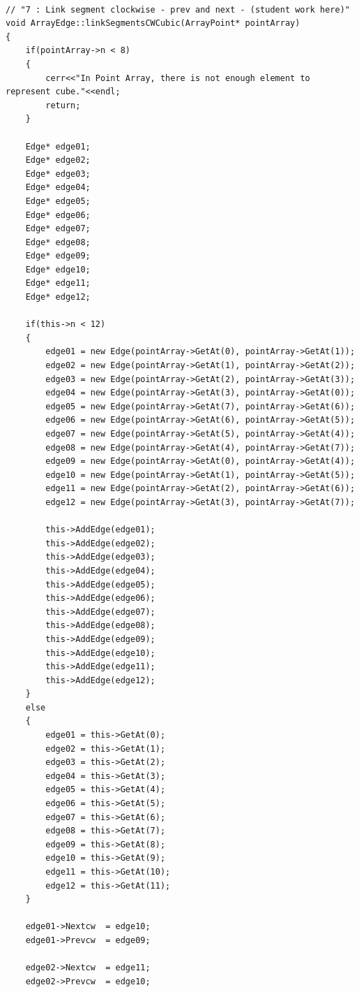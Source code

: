 \documentclass{article}
\begin{document}
\begin{lstlisting}[label=exercice-cpp, caption=Exercice.cpp]	

// "7 : Link segment clockwise - prev and next - (student work here)"
void ArrayEdge::linkSegmentsCWCubic(ArrayPoint* pointArray)
{
    if(pointArray->n < 8)
    {
        cerr<<"In Point Array, there is not enough element to represent cube."<<endl;
        return;
    }

    Edge* edge01;
    Edge* edge02;
    Edge* edge03;
    Edge* edge04;
    Edge* edge05;
    Edge* edge06;
    Edge* edge07;
    Edge* edge08;
    Edge* edge09;
    Edge* edge10;
    Edge* edge11;
    Edge* edge12;

    if(this->n < 12)
    {
        edge01 = new Edge(pointArray->GetAt(0), pointArray->GetAt(1));
        edge02 = new Edge(pointArray->GetAt(1), pointArray->GetAt(2));
        edge03 = new Edge(pointArray->GetAt(2), pointArray->GetAt(3));
        edge04 = new Edge(pointArray->GetAt(3), pointArray->GetAt(0));
        edge05 = new Edge(pointArray->GetAt(7), pointArray->GetAt(6));
        edge06 = new Edge(pointArray->GetAt(6), pointArray->GetAt(5));
        edge07 = new Edge(pointArray->GetAt(5), pointArray->GetAt(4));
        edge08 = new Edge(pointArray->GetAt(4), pointArray->GetAt(7));
        edge09 = new Edge(pointArray->GetAt(0), pointArray->GetAt(4));
        edge10 = new Edge(pointArray->GetAt(1), pointArray->GetAt(5));
        edge11 = new Edge(pointArray->GetAt(2), pointArray->GetAt(6));
        edge12 = new Edge(pointArray->GetAt(3), pointArray->GetAt(7));

        this->AddEdge(edge01);
        this->AddEdge(edge02);
        this->AddEdge(edge03);
        this->AddEdge(edge04);
        this->AddEdge(edge05);
        this->AddEdge(edge06);
        this->AddEdge(edge07);
        this->AddEdge(edge08);
        this->AddEdge(edge09);
        this->AddEdge(edge10);
        this->AddEdge(edge11);
        this->AddEdge(edge12);
    }
    else
    {
        edge01 = this->GetAt(0);
        edge02 = this->GetAt(1);
        edge03 = this->GetAt(2);
        edge04 = this->GetAt(3);
        edge05 = this->GetAt(4);
        edge06 = this->GetAt(5);
        edge07 = this->GetAt(6);
        edge08 = this->GetAt(7);
        edge09 = this->GetAt(8);
        edge10 = this->GetAt(9);
        edge11 = this->GetAt(10);
        edge12 = this->GetAt(11);
    }

    edge01->Nextcw  = edge10;
    edge01->Prevcw  = edge09;

    edge02->Nextcw  = edge11;
    edge02->Prevcw  = edge10;


\end{lstlisting}
\end{document}
